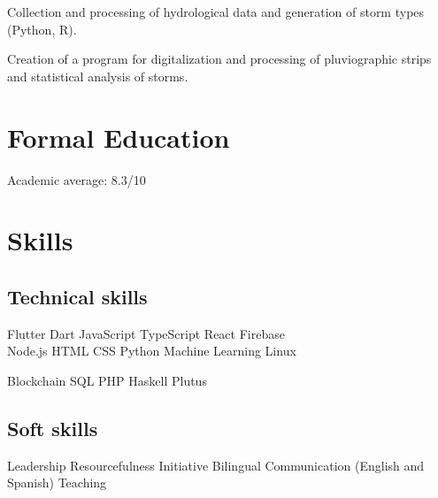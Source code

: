 \documentclass[]{robertino-cv}
\begin{document}
\begin{minipage}[t]{0.48\textwidth}
\begin{tightemize}
\item Collection and processing of hydrological data and generation of storm types (Python, R).
\item Creation of a program for digitalization and processing of pluviographic strips and statistical analysis of storms.
\end{tightemize}
\sectionsep



\section{Formal Education}

\begin{tightemize}
\item Academic average: 8.3/10
\end{tightemize}
\sectionsep

\sectionsep



\section{Skills}
\subsection{Technical skills}
Flutter \textbullet{}
Dart \textbullet{}
JavaScript \textbullet{}
TypeScript \textbullet{}
React \textbullet{}
Firebase \textbullet{} \\
Node.js \textbullet{}
HTML \textbullet{}
CSS \textbullet{}
Python \textbullet{}
Machine Learning \textbullet{}
Linux

Blockchain \textbullet{}
SQL\textbullet{}
PHP \textbullet{}
Haskell \textbullet{}
Plutus
\sectionsep

\subsection{Soft skills}
Leadership \textbullet{}
Resourcefulness \textbullet{}
Initiative \textbullet{}
Bilingual Communication (English and Spanish) \textbullet{}
Teaching

%
%

\end{minipage} 
\end{document}
